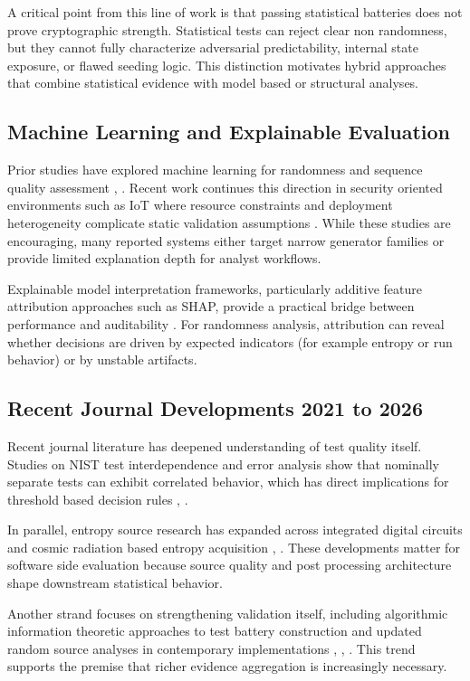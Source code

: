\documentclass[conference]{IEEEtran}
\begin{document}
A critical point from this line of work is that passing statistical batteries does not prove cryptographic strength. Statistical tests can reject clear non randomness, but they cannot fully characterize adversarial predictability, internal state exposure, or flawed seeding logic. This distinction motivates hybrid approaches that combine statistical evidence with model based or structural analyses.

\subsection{Machine Learning and Explainable Evaluation}
Prior studies have explored machine learning for randomness and sequence quality assessment \cite{b5}, \cite{b6}. Recent work continues this direction in security oriented environments such as IoT where resource constraints and deployment heterogeneity complicate static validation assumptions \cite{b11}. While these studies are encouraging, many reported systems either target narrow generator families or provide limited explanation depth for analyst workflows.

Explainable model interpretation frameworks, particularly additive feature attribution approaches such as SHAP, provide a practical bridge between performance and auditability \cite{b8}. For randomness analysis, attribution can reveal whether decisions are driven by expected indicators (for example entropy or run behavior) or by unstable artifacts.

\subsection{Recent Journal Developments 2021 to 2026}
Recent journal literature has deepened understanding of test quality itself. Studies on NIST test interdependence and error analysis show that nominally separate tests can exhibit correlated behavior, which has direct implications for threshold based decision rules \cite{b12}, \cite{b13}.

In parallel, entropy source research has expanded across integrated digital circuits and cosmic radiation based entropy acquisition \cite{b14}, \cite{b15}. These developments matter for software side evaluation because source quality and post processing architecture shape downstream statistical behavior.

Another strand focuses on strengthening validation itself, including algorithmic information theoretic approaches to test battery construction and updated random source analyses in contemporary implementations \cite{b18}, \cite{b19}, \cite{b20}. This trend supports the premise that richer evidence aggregation is increasingly necessary.
\end{document}
